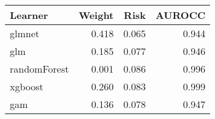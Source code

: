 \documentclass{article}
\begin{document}
\begin{table}[ht]
\centering
\begin{tabular}{lrrr}
  \hline
Learner & Weight & Risk & AUROCC \\ 
  \hline
glmnet & 0.418 & 0.065 & 0.944 \\ 
  glm & 0.185 & 0.077 & 0.946 \\ 
  randomForest & 0.001 & 0.086 & 0.996 \\ 
  xgboost & 0.260 & 0.083 & 0.999 \\ 
  gam & 0.136 & 0.078 & 0.947 \\ 
   \hline
\end{tabular}
\end{table}
\end{document}
